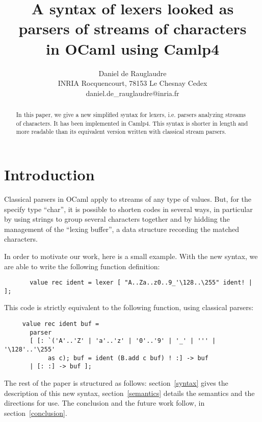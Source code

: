 \documentclass[11pt]{article}
\begin{document}
\title{A syntax of lexers looked as parsers of streams of characters\\
  in OCaml using Camlp4}

\date{}
\author{Daniel de Rauglaudre\\
INRIA Rocquencourt,
78153 Le Chesnay Cedex \\
daniel.de\_rauglaudre@inria.fr}

\thispagestyle{empty}

\maketitle

\begin{abstract}
In this paper, we give a new simplified syntax for lexers,
i.e. parsers analyzing streams of characters. It has been implemented
in Camlp4. This syntax is shorter in length and more readable than its
equivalent version written with classical stream parsers.
\end{abstract}

\section{Introduction}

Classical parsers in OCaml apply to streams of any type of
values. But, for the specify type ``char'', it is possible to shorten
codes in several ways, in particular by using strings to group several
characters together and by hidding the management of the ``lexing
buffer'', a data structure recording the matched characters.

In order to motivate our work, here is a small example. With the new
syntax, we are able to write the following function definition:

\begin{verbatim}
       value rec ident = lexer [ "A..Za..z0..9_'\128..\255" ident! | ];
\end{verbatim}

This code is strictly equivalent to the following function, using classical
parsers:

\begin{verbatim}
     value rec ident buf =
       parser
       [ [: `('A'..'Z' | 'a'..'z' | '0'..'9' | '_' | ''' | '\128'..'\255'
            as c); buf = ident (B.add c buf) ! :] -> buf
       | [: :] -> buf ];
\end{verbatim}

The rest of the paper is structured as follows: section~\ref{syntax}
gives the description of this new syntax, section~\ref{semantics}
details the semantics and the directions for use. The conclusion and
the future work follow, in section~\ref{conclusion}.
\end{document}
